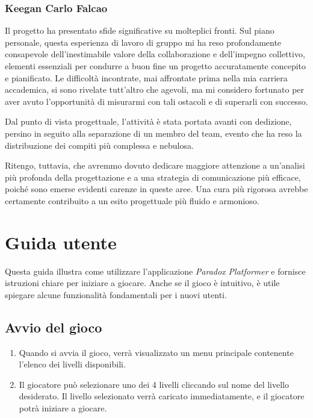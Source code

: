 \documentclass[a4paper,12pt]{report}
\begin{document}
	\subsection{Keegan Carlo Falcao}
	Il progetto ha presentato sfide significative su molteplici fronti. Sul piano personale, questa esperienza di lavoro di gruppo mi ha reso profondamente consapevole dell'inestimabile valore della collaborazione e dell'impegno collettivo, elementi essenziali per condurre a buon fine un progetto accuratamente concepito e pianificato. Le difficoltà incontrate, mai affrontate prima nella mia carriera accademica, si sono rivelate tutt'altro che agevoli, ma mi considero fortunato per aver avuto l'opportunità di misurarmi con tali ostacoli e di superarli con successo.
	
	Dal punto di vista progettuale, l'attività è stata portata avanti con dedizione, persino in seguito alla separazione di un membro del team, evento che ha reso la distribuzione dei compiti più complessa e nebulosa.
	
	Ritengo, tuttavia, che avremmo dovuto dedicare maggiore attenzione a un'analisi più profonda della progettazione e a una strategia di comunicazione più efficace, poiché sono emerse evidenti carenze in queste aree. Una cura più rigorosa avrebbe certamente contribuito a un esito progettuale più fluido e armonioso.
	
	\appendix
	\chapter{Guida utente}
	
	Questa guida illustra come utilizzare l’applicazione \textit{Paradox Platformer} e fornisce istruzioni chiare per iniziare a giocare. Anche se il gioco è intuitivo, è utile spiegare alcune funzionalità fondamentali per i nuovi utenti.
	
	\section{Avvio del gioco}
	
	\begin{enumerate}
		\item Quando si avvia il gioco, verrà visualizzato un menu principale contenente l’elenco dei livelli disponibili.
		\item Il giocatore può selezionare uno dei 4 livelli cliccando sul nome del livello desiderato. Il livello selezionato verrà caricato immediatamente, e il giocatore potrà iniziare a giocare.
	\end{enumerate}
	
\end{document}
